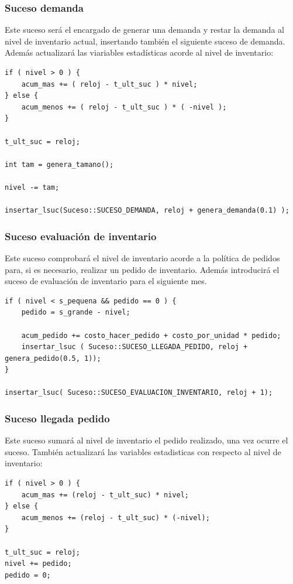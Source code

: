 \documentclass[12pt, spanish]{article}
\begin{document}
\subsubsection{Suceso demanda}

Este suceso será el encargado de generar una demanda y restar la demanda al nivel de inventario actual, insertando también el siguiente suceso de demanda. Además actualizará las viariables estadísticas acorde al nivel de inventario:

\begin{lstlisting}
if ( nivel > 0 ) {
	acum_mas += ( reloj - t_ult_suc ) * nivel;
} else {
	acum_menos += ( reloj - t_ult_suc ) * ( -nivel );
}

t_ult_suc = reloj;

int tam = genera_tamano();

nivel -= tam;

insertar_lsuc(Suceso::SUCESO_DEMANDA, reloj + genera_demanda(0.1) );
\end{lstlisting}

\subsubsection{Suceso evaluación de inventario}

Este suceso comprobará el nivel de inventario acorde a la política de pedidos para, si es necesario, realizar un pedido de inventario. Además introducirá el suceso de evaluación de inventario para el siguiente mes.

\begin{lstlisting}
if ( nivel < s_pequena && pedido == 0 ) {
	pedido = s_grande - nivel;

	acum_pedido += costo_hacer_pedido + costo_por_unidad * pedido;
	insertar_lsuc ( Suceso::SUCESO_LLEGADA_PEDIDO, reloj + genera_pedido(0.5, 1));
}

insertar_lsuc( Suceso::SUCESO_EVALUACION_INVENTARIO, reloj + 1);
\end{lstlisting}

\subsubsection{Suceso llegada pedido}

Este suceso sumará al nivel de inventario el pedido realizado, una vez ocurre el suceso. También actualizará las variables estadisticas con respecto al nivel de inventario:

\begin{lstlisting}
if ( nivel > 0 ) {
	acum_mas += (reloj - t_ult_suc) * nivel;
} else {
	acum_menos += (reloj - t_ult_suc) * (-nivel);
}

t_ult_suc = reloj;
nivel += pedido;
pedido = 0;
\end{lstlisting}
\end{document}

